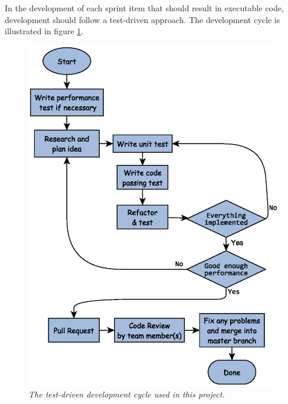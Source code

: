 In the development of each sprint item that should result in executable code, development should follow a test-driven approach. The development cycle is illustrated in figure \ref{fig:sprint_development_cycle}.

\begin{figure}[htb]
	\centering
	\includegraphics[width=120mm]{images/sprint_item_development.eps}
	\caption{\textit{The test-driven development cycle used in this project.}}
	\label{fig:sprint_development_cycle}
\end{figure}
